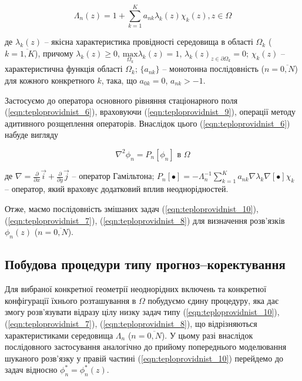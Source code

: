\begin{equation}
    \label{eqn:teploprovidnist_9}
    \Lambda_{n}{(z) = {1 + {\sum\limits_{k = 1}^{K}{a_{\mathit{\text{nk}}}\lambda_{k}(z)\chi_{k}(z)}}}}, z\in\Omega
\end{equation}

\noindent де $\lambda_{k}(z)$ -- якісна характеристика провідності середовища в області $\Omega_k$ ($k =
\overline{1,K}$), причому $\lambda_{k}{(z) \geq 0}$, $\underset{\Omega_{k}}{\text{max}}\lambda_{k}(z){= 1}$,
$\lambda_{k}(z)_{z\in\partial\Omega_{k}} = 0$; $\chi_{k}(z)$ -- характеристична функція області $\Omega_k$; $\{
a_{nk}\}$ -- монотонна послідовність ($n = \overline{0,N}$) для кожного конкретного $k$, така, що $a_{0k} = 0$,
$a_{\mathit{\text{nk}}} > {- 1}$.

Застосуємо до оператора основного рівняння стаціонарного поля (\ref{eqn:teploprovidnist_6}), враховуючи
(\ref{eqn:teploprovidnist_9}), операції методу адитивного розщеплення операторів. Внаслідок цього
(\ref{eqn:teploprovidnist_6}) набуде вигляду

\begin{equation}
    \label{eqn:teploprovidnist_10}
    \nabla^{2}{\phi_{n} = P_{n}}\left\lbrack \phi_{n} \right\rbrack \text{ в } \Omega
\end{equation}

\noindent де ${\nabla = \frac{\partial}{\partial x}}{\overrightarrow{i} + \frac{\partial}{\partial
y}}\overrightarrow{j}$ -- оператор Гамільтона; $P_{n}[\bullet] = {- \Lambda_{n}^{- 1}}{\sum\limits_{k =
1}^{K}{a_{\mathit{\text{nk}}}\nabla\lambda_{k}\nabla[\bullet]}}\chi_{k}$ -- оператор, який враховує додатковий вплив
неоднорідностей.

Отже, маємо послідовність змішаних задач (\ref{eqn:teploprovidnist_10}), (\ref{eqn:teploprovidnist_7}),
(\ref{eqn:teploprovidnist_8}) для визначення розв'язків $\phi_{n}(z)$ ($n = \overline{0,N}$).

\subsection{Побудова процедури типу прогноз--коректування}

Для вибраної конкретної геометрії неоднорідних включень та конкретної конфігурації їхнього розташування в $\Omega$
побудуємо єдину процедуру, яка дає змогу розв'язувати відразу цілу низку задач типу (\ref{eqn:teploprovidnist_10}),
(\ref{eqn:teploprovidnist_7}), (\ref{eqn:teploprovidnist_8}), що відрізняються характеристиками середовища $\Lambda_{n}$
($n = \overline{0,N}$). У цьому разі внаслідок послідовного застосування аналогічно до прийому попереднього моделювання
шуканого розв'язку у правій частині (\ref{eqn:teploprovidnist_10}) перейдемо до задач відносно ${\phi_{n}^{*} =
\phi_{n}^{*}}(z)$.

